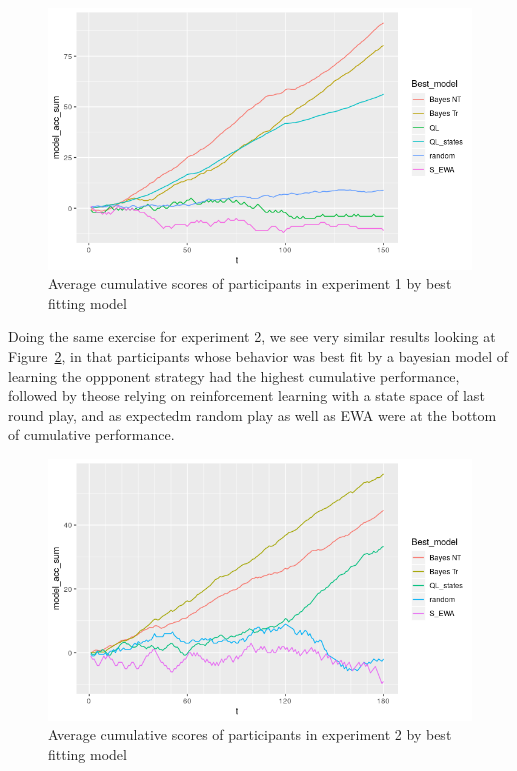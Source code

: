 \documentclass[man,floatsintext]{apa6}
\begin{document}
\begin{figure}

{\centering \includegraphics{../Report/images/exp1_cumScores} 

}

\caption{Average cumulative scores of participants in experiment 1 by best fitting model}\label{fig:exp1-cumScores}
\end{figure}

Doing the same exercise for experiment 2, we see very similar results looking at Figure~\ref{fig:exp2-cumScores}, in that participants whose behavior was best fit by a bayesian model of learning the oppponent strategy had the highest cumulative performance, followed by theose relying on reinforcement learning with a state space of last round play, and as expectedm random play as well as EWA were at the bottom of cumulative performance.

\begin{figure}

{\centering \includegraphics{../Report/images/exp2_cumScores} 

}

\caption{Average cumulative scores of participants in experiment 2 by best fitting model}\label{fig:exp2-cumScores}
\end{figure}
\end{document}
